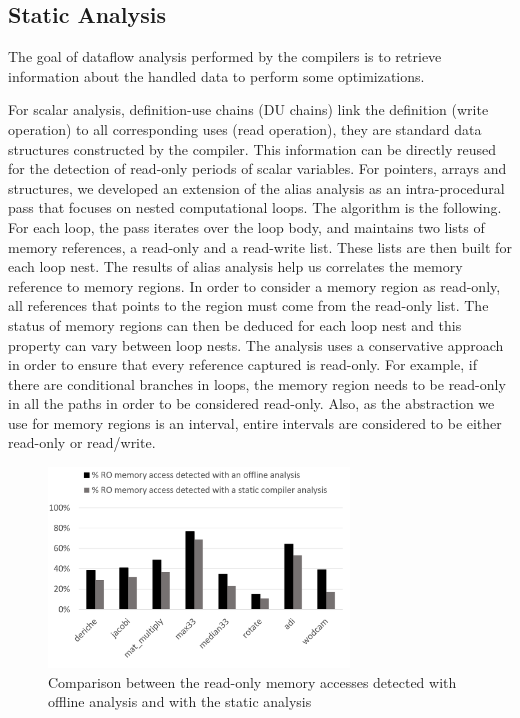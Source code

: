 \documentclass[sigconf]{acmart}
\begin{document}
\subsection{Static Analysis}

The goal of dataflow analysis performed by the compilers is to retrieve information about the handled data to perform some optimizations.

For scalar analysis, definition-use chains (DU chains) link the definition (write operation) to all corresponding uses (read operation), they are standard data structures constructed by the compiler.
This information can be directly reused for the detection of read-only periods of scalar variables. For pointers, arrays and structures, we developed an extension of the alias analysis as an intra-procedural pass that focuses on nested computational loops. The algorithm is the following. For each loop, the pass iterates over the loop body, and maintains two lists of memory references, a read-only and a read-write list. These lists are then built for each loop nest. The results of alias analysis help us correlates the memory reference to memory regions. In order to consider a memory region as read-only, all references that points to the region must come from the read-only list. The status of memory regions can then be deduced for each loop nest and this property can vary between loop nests. The analysis uses a conservative approach in order to ensure that every reference captured is read-only. For example, if there are conditional branches in loops, the memory region needs to be read-only in all the paths in order to be considered read-only. Also, as the abstraction we use for memory regions is an interval, entire intervals are considered to be either read-only or read/write. 



\begin{figure}
    \centering
    \includegraphics[width=8cm]{./images/plugin_result.png}
    \caption{Comparison between the read-only memory accesses detected with offline analysis and with the static analysis}
    \label{comparAcces}
\end{figure}
\end{document}
